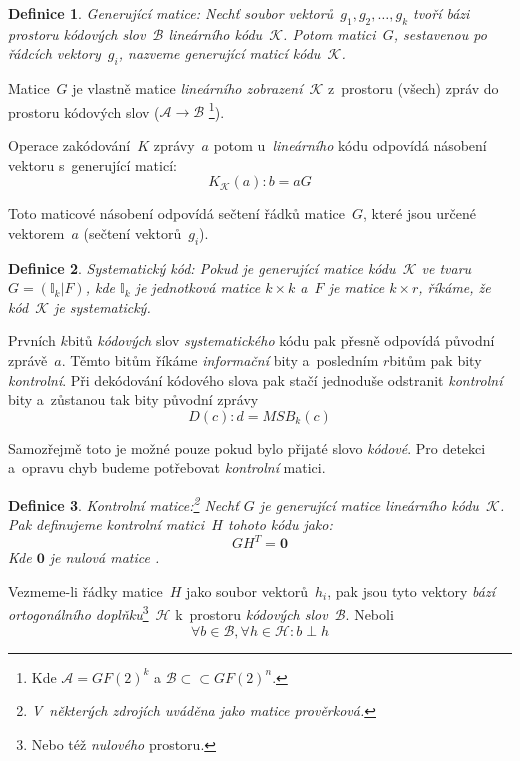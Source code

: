 \documentclass[thesis=M,czech,hidelinks]{FITthesis}[2012/06/26]
\newcommand{\0}{{\textcolor[gray]{0.75}{0}}}
\newtheorem{definice}{Definice}
\begin{document}
\begin{definice}{Generující matice:}
    Nechť soubor vektorů~$g_1,g_2,\ldots,g_k$ tvoří bázi prostoru
    kódových slov~$\mathcal{B}$ \emph{lineárního kódu}~$\mathcal{K}$. Potom
    matici~$G$, sestavenou po řádcích vektory~$g_i$, nazveme \emph{generující
    maticí} kódu~$\mathcal{K}$.
\end{definice}

Matice~$G$ je vlastně matice \emph{lineárního zobrazení}~$\mathcal{K}$
z~prostoru (všech) zpráv do prostoru kódových slov
($\mathcal{A} \to \mathcal{B}$ \footnote{
    Kde $\mathcal{A} = GF(2)^k$ a $\mathcal{B} \subset \subset GF(2)^n$.
}).

Operace zakódování~$K$ zprávy~$a$ potom u~\emph{lineárního} kódu odpovídá
násobení vektoru s~generující maticí:
$$ K_\mathcal{K}(a) : b = aG $$

Toto maticové násobení odpovídá sečtení řádků matice~$G$, které jsou určené
vektorem~$a$ (sečtení vektorů~$g_i$).

\begin{definice}{Systematický kód:}
    Pokud je \emph{generující} matice kódu~$\mathcal{K}$ ve tvaru \\
    $G=(\mathbb{I}_k|F)$, kde $\mathbb{I}_k$ je jednotková matice $k \times k$
    a~$F$ je matice $k \times r$, říkáme, že kód~$\mathcal{K}$ je
    \emph{systematický}.
\end{definice}

Prvních $k$\;bitů \emph{kódových} slov \emph{systematického} kódu pak přesně
odpovídá původní zprávě~$a$. Těmto bitům říkáme \emph{informační} bity
a~posledním $r$\;bitům pak bity \emph{kontrolní}. Při dekódování kódového slova
pak stačí jednoduše odstranit \emph{kontrolní} bity a~zůstanou tak bity původní
zprávy
$$ D(c) : d = MSB_k(c) $$

Samozřejmě toto je možné pouze pokud bylo přijaté slovo \emph{kódové}. Pro
detekci a~opravu chyb budeme potřebovat \emph{kontrolní} matici.

\begin{definice}{Kontrolní matice:}\footnote{
    V~některých zdrojích uváděna jako matice \emph{prověrková}.
}
    Nechť $G$ je \emph{generující} matice \emph{lineárního kódu}~$\mathcal{K}$.
    Pak definujeme \emph{kontrolní matici}~$H$ tohoto kódu jako:
    $$ G H^T = \textbf{0} $$
    Kde $\textbf{0}$ je \emph{nulová matice} .
\end{definice}


Vezmeme-li řádky matice~$H$ jako soubor vektorů~$h_i$, pak jsou tyto vektory
\emph{bází} \emph{ortogonálního doplňku}\footnote{
    Nebo též \emph{nulového} prostoru.
}~$\mathcal{H}$ k~prostoru \emph{kódových slov}~$\mathcal{B}$. Neboli
$$ \forall b \in \mathcal{B}, \forall h \in \mathcal{H} : b \perp h $$
\end{document}
